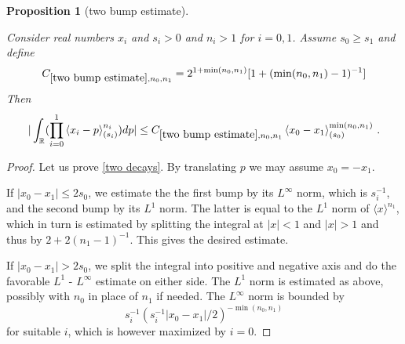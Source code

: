 \documentclass[12pt,reqno]{amsart}
\theoremstyle{plain}
\newtheorem{proposition}[theorem]{Proposition}
\numberwithin{equation}{section}
\theoremstyle{remark}
\newcommand{\uses}[1]{}
\newcommand{\usesdefs}[1]{}
\newcommand{\leanok}{}
\newcommand{\lean}[1]{}
\newcommand{\R}{{\mathbb R}}
\begin{document}
\begin{proposition}[two bump estimate]\label{two bump estimate}\uses{}\usesdefs{bracket bump}
\lean{Auto.twoBumpEstimate}
\leanok
    Consider real numbers $x_i$ and  $s_i>0$ and $n_i>1$ for $i=0,1$.  Assume $s_0\ge s_1$ and define
\begin{equation}\label{tb0}
     C_{\ref{two bump estimate},n_0,n_1}=2^{1+\min(n_0,n_1)} [1+(\min(n_0,n_1)-1)^{-1}]
\end{equation}
  Then
\begin{equation}\label{two decays}
   | \int_{\R} (\prod_{i=0}^1 \left<x_i-p\right>^{n_i}_{(s_i)}) dp|\le C_{\ref{two bump estimate},n_0,n_1}
\left<x_0-x_1\right>^{\min(n_0,n_1)}_{(s_0)}\, .
\end{equation}
\end{proposition}
\begin{proof}
Let us prove \eqref{two decays}.
By translating $p$ we may assume $x_0=-x_1$.

If $|x_0-x_1|\le 2s_0$, we estimate the the first bump
by its $L^\infty$ norm, which is $s_i^{-1}$, and the second bump by its $L^1$ norm.
The latter is equal to the $L^1$ norm of $\langle x\rangle^{n_1}$, which in turn is estimated by splitting the integral
at $|x|<1$ and $|x|>1$ and thus by $2+2(n_1-1)^{-1}$. This gives the desired estimate.

If $|x_0-x_1|> 2s_0$, we split the integral into positive and negative axis
and do the favorable $L^1$ - $L^\infty$ estimate on either side.
The $L^1$ norm is estimated as above, possibly with $n_0$ in place of $n_1$ if needed. The $L^\infty$ norm is
bounded by
\begin{equation}
    s_i^{-1}(s_i^{-1}|x_0-x_1|/2)^{-\min(n_0,n_1)}
\end{equation}
for suitable $i$, which is however
maximized by $i=0$.
\end{proof}
\end{document}
